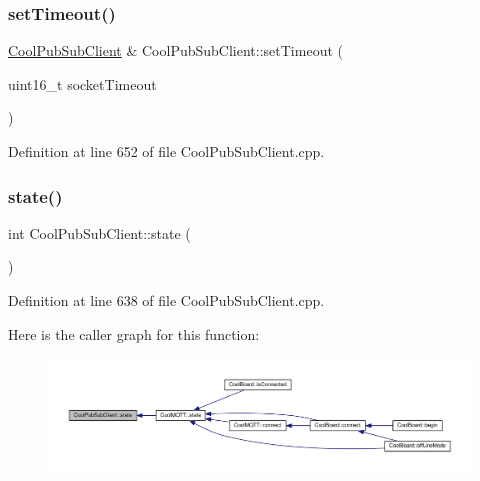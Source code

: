 \subsubsection{\texorpdfstring{set\+Timeout()}{setTimeout()}}
{\footnotesize\ttfamily \hyperlink{class_cool_pub_sub_client}{Cool\+Pub\+Sub\+Client} \& Cool\+Pub\+Sub\+Client\+::set\+Timeout (\begin{DoxyParamCaption}\item[{uint16\+\_\+t}]{socket\+Timeout }\end{DoxyParamCaption})}



Definition at line 652 of file Cool\+Pub\+Sub\+Client.\+cpp.

\mbox{\label{class_cool_pub_sub_client_a3245a5afc6d22e61270dcfe392ccb866}} 
\subsubsection{\texorpdfstring{state()}{state()}}
{\footnotesize\ttfamily int Cool\+Pub\+Sub\+Client\+::state (\begin{DoxyParamCaption}{ }\end{DoxyParamCaption})}



Definition at line 638 of file Cool\+Pub\+Sub\+Client.\+cpp.

Here is the caller graph for this function\+:
\nopagebreak
\begin{figure}[H]
\begin{center}
\leavevmode
\includegraphics[width=350pt]{class_cool_pub_sub_client_a3245a5afc6d22e61270dcfe392ccb866_icgraph}
\end{center}
\end{figure}
\mbox{\label{class_cool_pub_sub_client_ac1ebc9ad874128aefa985d78496d2e8f}} 
